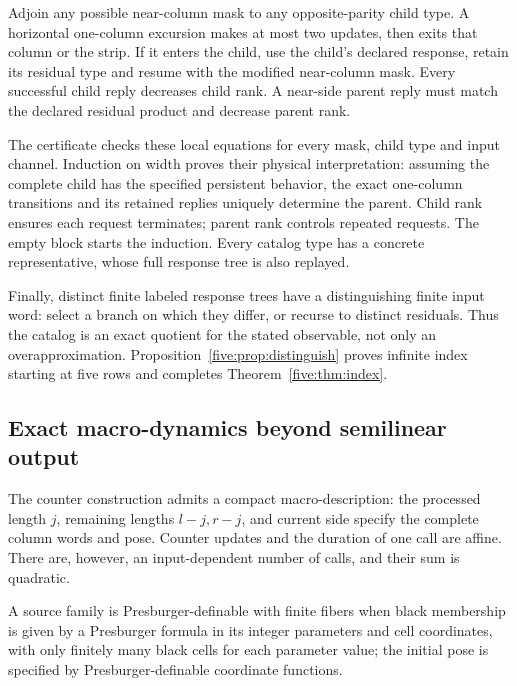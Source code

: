 Adjoin any possible near-column mask to any opposite-parity child type.
A horizontal one-column excursion makes at most two updates, then exits that
column or the strip. If it enters the child, use the child's declared response,
retain its residual type and resume with the modified near-column mask.
Every successful child reply decreases child rank. A near-side parent reply
must match the declared residual product and decrease parent rank.

The certificate checks these local equations for every mask, child type and
input channel. Induction on width proves their physical interpretation:
assuming the complete child has the specified persistent behavior, the exact
one-column transitions and its retained replies uniquely determine the parent.
Child rank ensures each request terminates; parent rank controls repeated
requests. The empty block starts the induction. Every catalog type has a
concrete representative, whose full response tree is also replayed.

Finally, distinct finite labeled response trees have a distinguishing finite
input word: select a branch on which they differ, or recurse to distinct residuals.
Thus the catalog is an exact quotient for the stated observable, not only an
overapproximation. Proposition~\ref{five:prop:distinguish} proves infinite index
starting at five rows and completes Theorem~\ref{five:thm:index}.

\subsection{Exact macro-dynamics beyond semilinear output}
The counter construction admits a compact macro-description: the processed
length $j$, remaining lengths $l-j,r-j$, and current side specify the complete
column words and pose. Counter updates and the duration of one call are affine.
There are, however, an input-dependent number of calls, and their sum is quadratic.

A source family is Presburger-definable with finite fibers when black
membership is given by a Presburger formula in its integer parameters and
cell coordinates, with only finitely many black cells for each parameter value;
the initial pose is specified by Presburger-definable coordinate functions.

